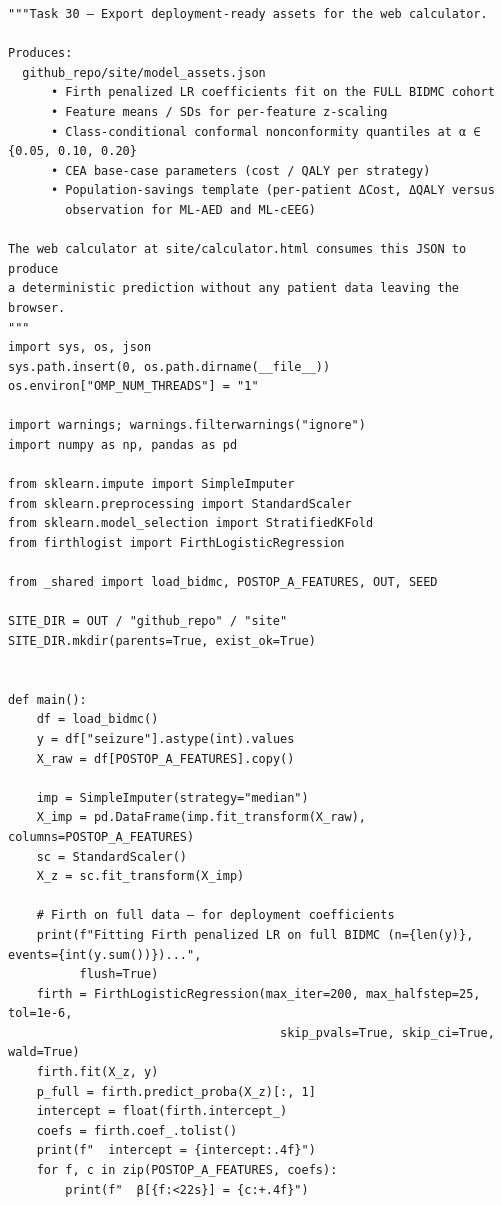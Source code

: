 \documentclass[11pt,a4paper]{article}
\begin{document}
\begin{lstlisting}[style=codeblock]
"""Task 30 — Export deployment-ready assets for the web calculator.

Produces:
  github_repo/site/model_assets.json
      • Firth penalized LR coefficients fit on the FULL BIDMC cohort
      • Feature means / SDs for per-feature z-scaling
      • Class-conditional conformal nonconformity quantiles at α ∈ {0.05, 0.10, 0.20}
      • CEA base-case parameters (cost / QALY per strategy)
      • Population-savings template (per-patient ΔCost, ΔQALY versus
        observation for ML-AED and ML-cEEG)

The web calculator at site/calculator.html consumes this JSON to produce
a deterministic prediction without any patient data leaving the browser.
"""
import sys, os, json
sys.path.insert(0, os.path.dirname(__file__))
os.environ["OMP_NUM_THREADS"] = "1"

import warnings; warnings.filterwarnings("ignore")
import numpy as np, pandas as pd

from sklearn.impute import SimpleImputer
from sklearn.preprocessing import StandardScaler
from sklearn.model_selection import StratifiedKFold
from firthlogist import FirthLogisticRegression

from _shared import load_bidmc, POSTOP_A_FEATURES, OUT, SEED

SITE_DIR = OUT / "github_repo" / "site"
SITE_DIR.mkdir(parents=True, exist_ok=True)


def main():
    df = load_bidmc()
    y = df["seizure"].astype(int).values
    X_raw = df[POSTOP_A_FEATURES].copy()

    imp = SimpleImputer(strategy="median")
    X_imp = pd.DataFrame(imp.fit_transform(X_raw), columns=POSTOP_A_FEATURES)
    sc = StandardScaler()
    X_z = sc.fit_transform(X_imp)

    # Firth on full data — for deployment coefficients
    print(f"Fitting Firth penalized LR on full BIDMC (n={len(y)}, events={int(y.sum())})...",
          flush=True)
    firth = FirthLogisticRegression(max_iter=200, max_halfstep=25, tol=1e-6,
                                      skip_pvals=True, skip_ci=True, wald=True)
    firth.fit(X_z, y)
    p_full = firth.predict_proba(X_z)[:, 1]
    intercept = float(firth.intercept_)
    coefs = firth.coef_.tolist()
    print(f"  intercept = {intercept:.4f}")
    for f, c in zip(POSTOP_A_FEATURES, coefs):
        print(f"  β[{f:<22s}] = {c:+.4f}")


\end{lstlisting}
\end{document}
